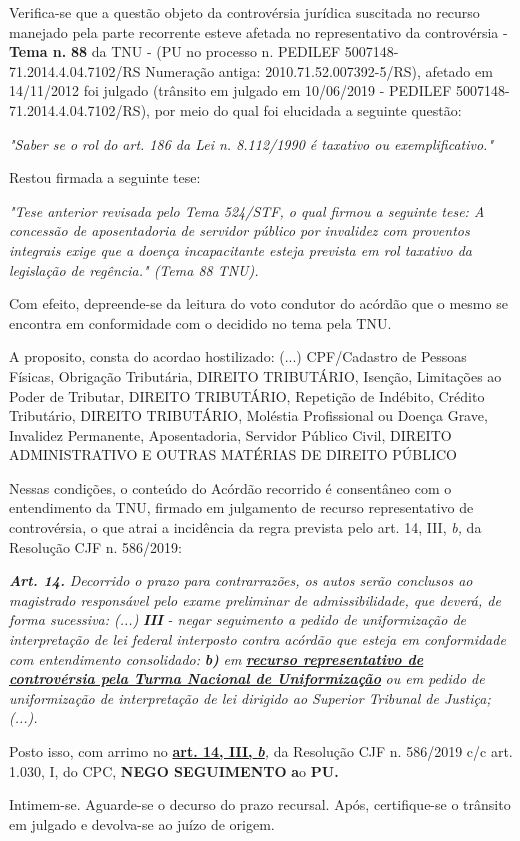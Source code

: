 \documentclass[12pt]{article}
\begin{document}
\justifying
\noindent Verifica-se que a questão objeto da controvérsia jurídica suscitada no recurso manejado pela parte recorrente esteve afetada no representativo da controvérsia - \textbf{Tema n. }\textbf{88} da TNU - (PU no processo n. PEDILEF 5007148-71.2014.4.04.7102/RS Numeração antiga: 2010.71.52.007392-5/RS),  afetado em 14/11/2012 foi julgado (trânsito em julgado em 10/06/2019 - PEDILEF 5007148-71.2014.4.04.7102/RS), por meio do qual foi elucidada a seguinte questão:

\noindent \textit{"Saber se o rol do art. 186 da Lei n. 8.112/1990 é taxativo ou exemplificativo."}

\noindent Restou firmada a seguinte tese:

\noindent \textit{"Tese anterior revisada pelo Tema 524/STF, o qual firmou a seguinte tese: A concessão de aposentadoria de servidor público por invalidez com proventos integrais exige que a doença incapacitante esteja prevista em rol taxativo da legislação de regência." (Tema 88 TNU).}

\noindent Com efeito, depreende-se da leitura do voto condutor do acórdão que o mesmo se encontra em conformidade com o decidido no  tema pela TNU.

\noindent A proposito, consta do acordao hostilizado: (...) CPF/Cadastro de Pessoas Físicas, Obrigação Tributária, DIREITO TRIBUTÁRIO, Isenção, Limitações ao Poder de Tributar, DIREITO TRIBUTÁRIO, Repetição de Indébito, Crédito Tributário, DIREITO TRIBUTÁRIO, Moléstia Profissional ou Doença Grave, Invalidez Permanente, Aposentadoria, Servidor Público Civil, DIREITO ADMINISTRATIVO E OUTRAS MATÉRIAS DE DIREITO PÚBLICO

\noindent Nessas condições, o conteúdo do Acórdão recorrido é consentâneo com o entendimento da TNU, firmado em julgamento de recurso representativo de controvérsia, o que atrai a incidência da regra prevista pelo art. 14, III, \textit{b,} da Resolução CJF n. 586/2019:

\noindent \textit{\textbf{Art. 14.}}\textit{ Decorrido o prazo para contrarrazões, os autos serão conclusos ao magistrado responsável pelo exame preliminar de admissibilidade, que deverá, de forma sucessiva: (...) }\textit{\textbf{III }}\textit{- negar seguimento a pedido de uniformização de interpretação de lei federal interposto contra acórdão que esteja em conformidade com entendimento consolidado: }\textit{\textbf{b)}}\textit{ em }\uline{\textit{\textbf{recurso representativo de controvérsia pela Turma Nacional de Uniformização}}}\textit{ ou em pedido de uniformização de interpretação de lei dirigido ao Superior Tribunal de Justiça;(...).}

\noindent Posto isso, com arrimo no \uline{\textbf{art. 14, III, }}\uline{\textit{\textbf{b}}}\textit{,} da Resolução CJF n. 586/2019 c/c art. 1.030, I, do CPC, \textbf{NEGO SEGUIMENTO }\textbf{a}o\textbf{ PU}\textbf{.}

\noindent Intimem-se. Aguarde-se o decurso do prazo recursal. Após, certifique-se o trânsito em julgado e devolva-se ao juízo de origem.
\end{document}
